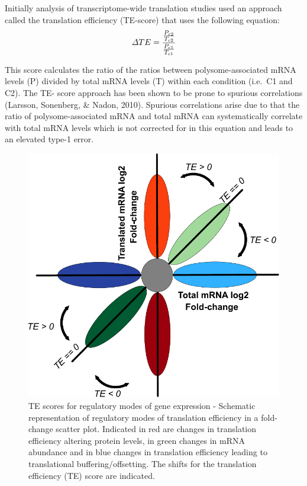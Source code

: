 \documentclass[12pt,openany]{book}
\begin{document}
Initially analysis of transcriptome-wide translation studies used an
approach called the translation efficiency (TE-score) that uses the
following equation:
\[\varDelta TE = \frac{\frac{P_{c2}}{T_{c2}}} {\frac{P_{c1}}{T_{c1}}}\\\]

This score calculates the ratio of the ratios between
polysome-associated mRNA levels (P) divided by total mRNA levels (T)
within each condition (i.e.~C1 and C2). The TE- score approach has been
shown to be prone to spurious correlations (Larsson, Sonenberg, \&
Nadon, 2010). Spurious correlations arise due to that the ratio of
polysome-associated mRNA and total mRNA can systematically correlate
with total mRNA levels which is not corrected for in this equation and
leads to an elevated type-1 error. \clearpage

\begin{figure}
  \includegraphics{./figures/geneModes_TE.pdf}
  \caption{TE scores for regulatory modes of gene expression -  Schematic representation of regulatory modes of translation efficiency in a fold-change scatter plot. Indicated in red are changes in translation efficiency altering protein levels, in green changes in mRNA abundance and in blue changes in translation efficiency leading to translational buffering/offsetting. The shifts for the translation efficiency (TE) score are indicated. \label{fig:TE}}
\end{figure}
\end{document}
